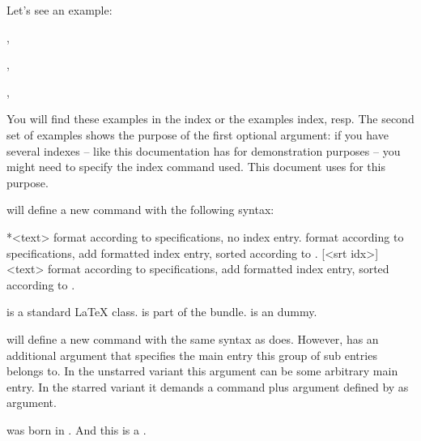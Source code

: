 \documentclass{cnpkgdoc}
\begin{document}
Let's see an example:
\begin{beispiel}
 , 
 
 , 

 , 
\end{beispiel}
You will find these examples in the index or the examples index, resp. The second
set of examples shows the purpose of the first optional argument: if you have
several indexes -- like this documentation has for demonstration purposes --
you might need to specify the index command used. This document uses 
for this purpose.

 will define a new command with the following syntax:
\begin{beschreibung}
 *{<text>} format  according to specifications, no
   index entry.
  \cnpkgdocarrow{} format 
   according to specifications, add formatted index entry, sorted according to
   .
 [<srt idx>]{<text>} \cnpkgdocarrow{} format
    according to specifications, add formatted index entry, sorted
   according to .
\end{beschreibung}

\begin{beispiel}
  is a standard \LaTeX{} class.
  is part of the \KOMAScript{} bundle.
  is an dummy.
\end{beispiel}

 will define a new command with the same syntax as 
does. However,  has an additional argument that specifies the
main entry this group of sub entries belongs to. In the unstarred variant this
argument can be some arbitrary main entry. In the starred variant it demands
a command plus argument defined by  as argument.

\begin{beispiel}
  was born in .
 And this is a .
\end{beispiel}
\end{document}
